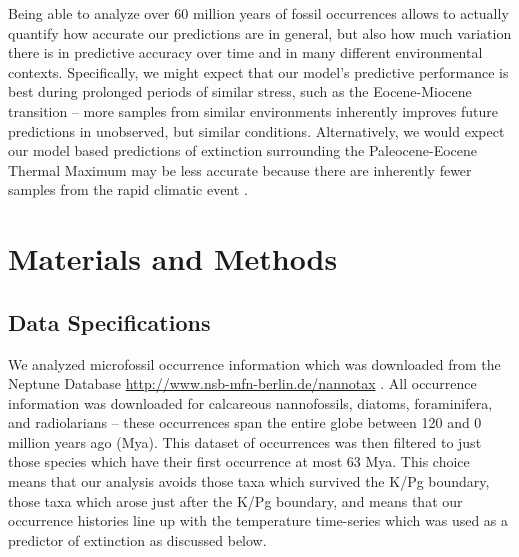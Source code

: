 \documentclass[12pt,letterpaper]{article}
\begin{document}
Being able to analyze over 60 million years of fossil occurrences allows to actually quantify how accurate our predictions are in general, but also how much variation there is in predictive accuracy over time and in many different environmental contexts. Specifically, we might expect that our model's predictive performance is best during prolonged periods of similar stress, such as the Eocene-Miocene transition \citep{Zachos2008} -- more samples from similar environments inherently improves future predictions in unobserved, but similar conditions. Alternatively, we would expect our model based predictions of extinction surrounding the Paleocene-Eocene Thermal Maximum may be less accurate because there are inherently fewer samples from the rapid climatic event \citep{Zachos2008}.



\section{Materials and Methods}

\subsection{Data Specifications}

We analyzed microfossil occurrence information which was downloaded from the Neptune Database \url{http://www.nsb-mfn-berlin.de/nannotax} \citep{Lazarus1994,SpencerCervato1999}. All occurrence information was downloaded for calcareous nannofossils, diatoms, foraminifera, and radiolarians -- these occurrences span the entire globe between 120 and 0 million years ago (Mya). This dataset of occurrences was then filtered to just those species which have their first occurrence at most 63 Mya. This choice means that our analysis avoids those taxa which survived the K/Pg boundary, those taxa which arose just after the K/Pg boundary, and means that our occurrence histories line up with the temperature time-series which was used as a predictor of extinction as discussed below.
\end{document}
